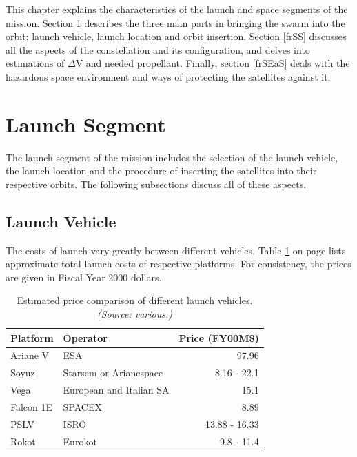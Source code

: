 This chapter explains the characteristics of the launch and space segments of the mission. Section \ref{frLS} describes the three main parts in bringing the swarm into the orbit: launch vehicle, launch location and orbit insertion. Section \ref{frSS} discusses all the aspects of the constellation and its configuration, and delves into estimations of $\Delta$V and needed propellant. Finally, section \ref{frSEaS} deals with the hazardous space environment and ways of protecting the satellites against it. 

\section{Launch Segment}
\label{frLS}

The launch segment of the mission includes the selection of the launch vehicle, the launch location and the procedure of inserting the satellites into their respective orbits. The following subsections discuss all of these aspects. 

\subsection{Launch Vehicle}
\label{frLSLV}

The costs of launch vary greatly between different vehicles. Table \ref{table:vehicleCosts} on page \pageref{table:vehicleCosts} lists approximate total launch costs of respective platforms. For consistency, the prices are given in Fiscal Year 2000 dollars.
\begin{table}[h]
\begin{centering}
\begin{tabular}{llr}
\toprule
Platform & Operator & Price (FY00M\$) \\
\hline \hline
Ariane V  & ESA & 97.96 \\
Soyuz   & Starsem or Arianespace&  8.16 - 22.1 \\
Vega   & European and Italian SA  & 15.1 \\
Falcon 1E  & SPACEX  & 8.89 \\
PSLV & ISRO & 13.88 - 16.33 \\
Rokot & Eurokot & 9.8 - 11.4 \\
\bottomrule
\end{tabular}
\caption{Estimated price comparison of different launch vehicles. \emph{(Source: various.)}}
\label{table:vehicleCosts}
\end{centering}
\end{table}

